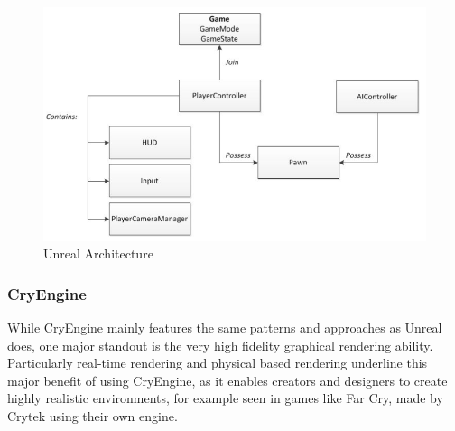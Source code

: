 \begin{figure}
    \centering
    \includegraphics[width=\textwidth]{Pictures/res/fundamentals/unreal-framework}
    \caption{Unreal Architecture~\cite{UNREAL:Framework}}
    \label{fig:unreal-concept}
\end{figure}
\subsubsection{CryEngine}\label{subsubsec:cryengine}
While CryEngine mainly features the same patterns and approaches as Unreal does, one major standout is the very high fidelity graphical rendering
ability.
Particularly real-time rendering and physical based rendering underline this major benefit of using CryEngine, as it enables
creators and designers to create highly realistic environments, for example seen in games like Far Cry, made by Crytek using their own
engine.


